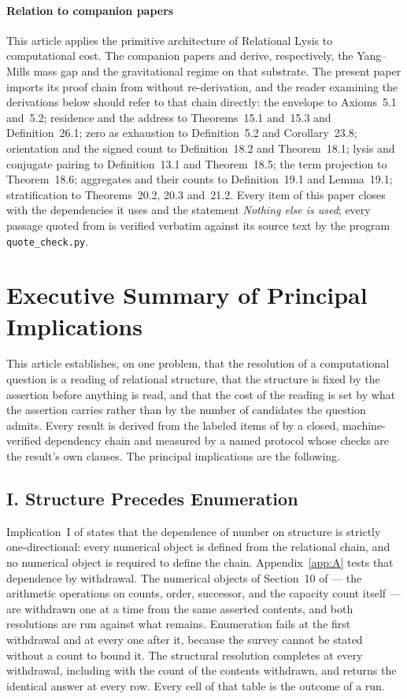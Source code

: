 \documentclass[pdflatex,sn-mathphys-num]{sn-jnl}
\providecommand{\bmhead}[1]{\paragraph{#1}}
\theoremstyle{thmstyleone}%
\theoremstyle{thmstyletwo}%
\theoremstyle{thmstylethree}%
\newcommand{\PA}{\cite{Swanagon2026PA}}
\begin{document}
\bmhead{Relation to companion papers}
This article applies the primitive architecture of Relational Lysis \PA{} to computational cost. The companion papers \cite{Swanagon2026YangMills} and \cite{Swanagon2026ThreeBody} derive, respectively, the Yang--Mills mass gap and the gravitational regime on that substrate. The present paper imports its proof chain from \PA{} without re-derivation, and the reader examining the derivations below should refer to that chain directly: the envelope to Axioms~5.1 and~5.2; residence and the address to Theorems~15.1 and~15.3 and Definition~26.1; zero as exhaustion to Definition~5.2 and Corollary~23.8; orientation and the signed count to Definition~18.2 and Theorem~18.1; lysis and conjugate pairing to Definition~13.1 and Theorem~18.5; the term projection to Theorem~18.6; aggregates and their counts to Definition~19.1 and Lemma~19.1; stratification to Theorems~20.2, 20.3 and~21.2. Every item of this paper closes with the dependencies it uses and the statement \emph{Nothing else is used}; every passage quoted from \PA{} is verified verbatim against its source text by the program \texttt{quote\_check.py}.

\section*{Executive Summary of Principal Implications}\label{sec:execsummary}
This article establishes, on one problem, that the resolution of a computational question is a reading of relational structure, that the structure is fixed by the assertion before anything is read, and that the cost of the reading is set by what the assertion carries rather than by the number of candidates the question admits. Every result is derived from the labeled items of \PA{} by a closed, machine-verified dependency chain and measured by a named protocol whose checks are the result's own clauses. The principal implications are the following.

\subsection*{I. Structure Precedes Enumeration}
Implication~I of \PA{} states that the dependence of number on structure is strictly one-directional: every numerical object is defined from the relational chain, and no numerical object is required to define the chain. Appendix~\ref{app:A} tests that dependence by withdrawal. The numerical objects of Section~10 of \PA{} --- the arithmetic operations on counts, order, successor, and the capacity count itself --- are withdrawn one at a time from the same asserted contents, and both resolutions are run against what remains. Enumeration fails at the first withdrawal and at every one after it, because the survey cannot be stated without a count to bound it. The structural resolution completes at every withdrawal, including with the count of the contents withdrawn, and returns the identical answer at every row. Every cell of that table is the outcome of a run.
\end{document}
